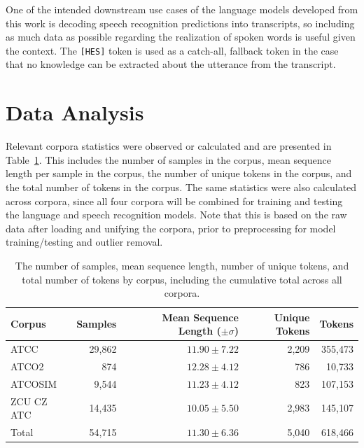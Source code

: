 \documentclass[12pt]{article}
\begin{document}
One of the intended downstream use cases of the language models developed from this work is decoding speech recognition predictions into transcripts,
so including as much data as possible regarding the realization of spoken words is useful given the context. The \lstinline|[HES]| token is used as a
catch-all, fallback token in the case that no knowledge can be extracted about the utterance from the transcript.

\section{Data Analysis}\label{sec:data_analysis}
Relevant corpora statistics were observed or calculated and are presented in Table~\ref{tab:corpora_stats}. This includes the number of samples in
the corpus, mean sequence length per sample in the corpus, the number of unique tokens in the corpus, and the total number of tokens in the corpus.
The same statistics were also calculated across corpora, since all four corpora will be combined for training and testing the language and speech
recognition models. Note that this is based on the raw data after loading and unifying the corpora, prior to preprocessing for model training/testing
and outlier removal.


\begin{table}[!t]
    \centering
    \begin{tabular}{l r r r r}
        \toprule
        \textbf{Corpus} & \textbf{Samples} & \textbf{Mean Sequence Length (\(\pm \sigma\))} & \textbf{Unique Tokens} & \textbf{Tokens} \\
        \midrule
        ATCC            & 29,862           & \(11.90 \pm 7.22\)                             & 2,209                  & 355,473         \\
        ATCO2           & 874              & \(12.28 \pm 4.12\)                             & 786                    & 10,733          \\
        ATCOSIM         & 9,544            & \(11.23 \pm 4.12\)                             & 823                    & 107,153         \\
        ZCU CZ ATC      & 14,435           & \(10.05 \pm 5.50\)                             & 2,983                  & 145,107         \\
        \midrule
        Total           & 54,715           & \(11.30 \pm 6.36\)                             & 5,040                  & 618,466         \\
        \bottomrule
    \end{tabular}
    \caption{The number of samples, mean sequence length, number of unique tokens, and total number of tokens by corpus, including the cumulative
        total across all corpora.}
    \label{tab:corpora_stats}
\end{table}
\end{document}
